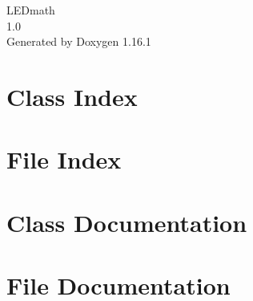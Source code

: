 \documentclass[twoside]{book}
\newcommand{\+}{\discretionary{\mbox{\scriptsize$\hookleftarrow$}}{}{}}
\newcommand{\clearemptydoublepage}{%
    \newpage{\pagestyle{empty}\cleardoublepage}%
  }
\begin{document}
  \raggedbottom
    \hypersetup{pageanchor=false,
                bookmarksnumbered=true,
                pdfencoding=unicode
               }
  \begin{titlepage}
  \vspace*{7cm}
  \begin{center}%
  {\Large LEDmath}\\
  [1ex]\large 1.\+0 \\
  \vspace*{1cm}
  {\large Generated by Doxygen 1.16.1}\\
  \end{center}
  \end{titlepage}
  \clearemptydoublepage
  \tableofcontents
  \clearemptydoublepage
  \hypersetup{pageanchor=true}
\chapter{Class Index}

\chapter{File Index}

\chapter{Class Documentation}



\chapter{File Documentation}







  \backmatter
  \newpage
  \clearemptydoublepage
  \printindex
\end{document}
